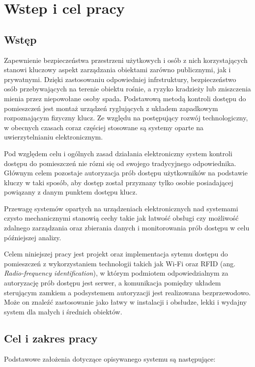 \chapter{Wstep i cel pracy}

	\section{Wstęp}

		Zapewnienie bezpieczeństwa przestrzeni użytkowych i osób z nich korzystających stanowi kluczowy aspekt zarządzania obiektami zarówno publicznymi, jak i prywatnymi. Dzięki zastosowaniu odpowiedniej infrstruktury, bezpieczeństwo osób przebywających na terenie obiektu rośnie, a ryzyko kradzieży lub zniszczenia mienia przez niepowołane osoby spada. Podstawową metodą kontroli dostępu do pomieszczeń jest montaż urządzeń ryglujących z układem zapadkowym rozpoznającym fizyczny klucz. Ze względu na postępujący rozwój technologiczny, w obecnych czasach coraz częściej stosowane są systemy oparte na uwierzytelnianiu elektronicznym.

		Pod względem celu i ogólnych zasad działania elektroniczny system kontroli dostępu do pomieszczeń nie rózni się od swojego tradycyjnego odpowiednika. Głównym celem pozostaje autoryzacja prób dostępu użytkowników na podstawie kluczy w taki sposób, aby dostęp został przyznany tylko osobie posiadającej powiązany z danym punktem dostępu klucz.

		Przewagę systemów opartych na urządzeniach elektronicznych nad systemami czysto mechanicznymi stanowią cechy takie jak łatwość obsługi czy możliwość zdalnego zarządzania oraz zbierania danych i monitorowania prób dostępu w celu późniejszej analizy.

		Celem niniejszej pracy jest projekt oraz implementacja sytemu dostępu do pomieszczeń z wykorzystaniem technologii takich jak Wi-Fi oraz RFID (ang. \textit{Radio-frequency identification}), w którym podmiotem odpowiedzialnym za autoryzację prób dostępu jest serwer, a komunikacja pomiędzy układem sterującym zamkiem a podsystemem autoryzacji jest realizowana bezprzewodowo. Może on znaleźć zastosowanie jako łatwy w instalacji i obsłudze, lekki i wydajny system dla małych i średnich obiektów.

	\section{Cel i zakres pracy}

		Podstawowe założenia dotyczące opisywanego systemu są następujące:

